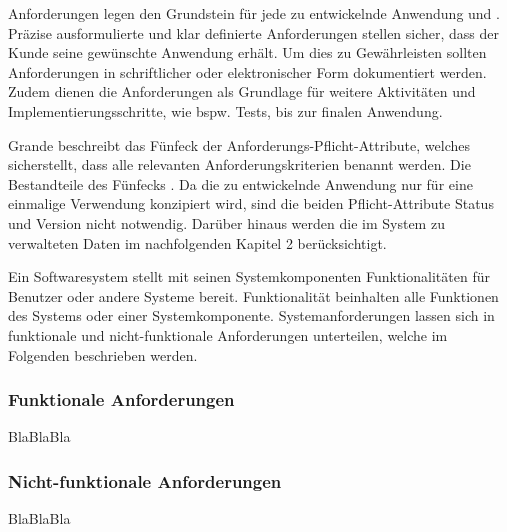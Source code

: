 Anforderungen legen den Grundstein für jede zu entwickelnde Anwendung und .
Präzise ausformulierte und klar definierte Anforderungen stellen sicher, dass der Kunde seine gewünschte Anwendung erhält. 
Um dies zu Gewährleisten sollten Anforderungen in schriftlicher oder elektronischer Form dokumentiert werden.
Zudem dienen die  Anforderungen als Grundlage für weitere Aktivitäten und Implementierungsschritte, wie bspw. Tests, bis zur finalen Anwendung.  

Grande beschreibt das Fünfeck der Anforderungs-Pflicht-Attribute, welches sicherstellt, dass alle relevanten Anforderungskriterien benannt werden. 
Die Bestandteile des Fünfecks .
Da die zu entwickelnde Anwendung nur für eine einmalige Verwendung konzipiert wird, sind die beiden Pflicht-Attribute Status und Version nicht notwendig. 
Darüber hinaus werden die im System zu verwalteten Daten im nachfolgenden Kapitel 2 berücksichtigt.

Ein Softwaresystem stellt mit seinen Systemkomponenten Funktionalitäten für Benutzer oder andere Systeme bereit. 
Funktionalität beinhalten alle Funktionen des Systems oder einer Systemkomponente.
Systemanforderungen lassen sich in funktionale und nicht-funktionale Anforderungen unterteilen, welche im Folgenden beschrieben werden.

\subsubsection{Funktionale Anforderungen}\label{sec:functional_requirements}

BlaBlaBla

\subsubsection{Nicht-funktionale Anforderungen}\label{sec:non_functional_requirements}

BlaBlaBla